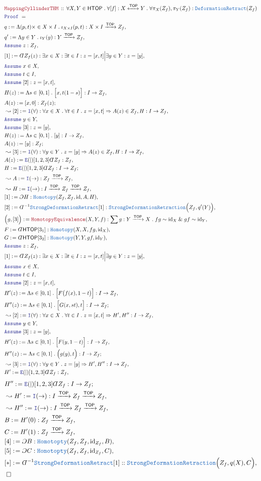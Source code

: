 \documentclass[12pt]{scrartcl}
\newcommand{\TYPE}[1]{\textcolor{NavyBlue}{\mathtt{#1}}}
\newcommand{\LOGIC}[1]{\textcolor{Blue}{\mathtt{#1}}}
\newcommand{\THM}[1]{\textcolor{Maroon}{\mathtt{#1}}}
\renewcommand{\.}{\; . \;}
\newcommand{\de}{: \kern 0.1pc =}
\newcommand{\Theorem}[2]{& \THM{#1} \, :: \, #2 \\ & \Proof = \\ }
\newcommand{\Page}[1]{ \begin{align*} #1 \end{align*}   }
\newcommand{ \bd }{ \ByDef }
\renewcommand{\And}{\; \& \;}
\newcommand{\Imply}{\Rightarrow}
\newcommand{\Intro}{\LOGIC{I}}
\newcommand{\Elim}{\LOGIC{E}}
\DeclareMathOperator*{\id}{id}
\newcommand{\ToIso}{\xleftrightarrow}
\newcommand{\Arrow}{\xrightarrow}
\newcommand{\Say}[3]{& #1 \de #2 : #3, \\}
\newcommand{\Conclude}[3]{& #1 \de #2 : #3; \\}
\newcommand{\Derive}[3]{& \leadsto #1 \de #2 : #3, \\}
\newcommand{\Assume}[2]{& \LOGIC{Assume} \; #1 : #2, \\}
\newcommand{\AssumeIn}[2]{& \LOGIC{Assume} \; #1 \in #2, \\}
\newcommand{\QED}{\; \square}
\newcommand{\EndProof}{& \QED \\}
\newcommand{\ByDef}{\rotatebox[origin=c]{-180}{$D$}}%
\newcommand{\ByConstr}{\rotatebox[origin=c]{-180}{$C$}}%
\newcommand{\Proof}{\LOGIC{Proof} \; }
\newcommand{\TOP}{\mathsf{TOP}}
\newcommand{\HTOP}{\mathsf{HTOP}}
\begin{document}
\Page{
	\Theorem{MappingCyllinderTHM}
	{
		\forall X,Y \in \HTOP \.
		\forall [f] : X \ToIso{\TOP} Y \.
		\forall \pi_X(Z_f),\pi_Y(Z_f) : \TYPE{DeformationRetract}(Z_f)
	}
	\Say{q}{\Lambda (p,t) \times \in X \times I \. \iota_{X \times I}(p,t) }
	{
		X \times I \Arrow{\TOP} Z_f
	}
	\Say{q'}{\Lambda y \in Y \. \iota_{Y}(y) }
	{
		Y  \Arrow{\TOP} Z_f
	}
	\Assume{z}{Z_f}
	\Say{[1]}{\bd Z_f(z)}{\exists x \in X : \exists t \in I : z = [x,t]  \Big| \exists y \in Y : z = [y]}
	\AssumeIn{x}{X}
	\AssumeIn{t}{I}
	\Assume{[2]}{z = [x,t]}
	\Say{H(z)}{\Lambda s \in [0,1] \. \Big[x,t(1-s)\Big]}{I \to Z_f}
	\Conclude{A(z)}{[x,0]}{ Z_f(z) }
	\Derive{[2]}{\Intro(\forall)}{\forall x \in X \. \forall t \in I \. z = [x,t] \Imply A(z) \in Z_f, H : I \to Z_f}
	\AssumeIn{y}{Y}
	\Assume{[3]}{z = [y]}
	\Say{H(z)}{\Lambda s \in [0,1] \. [y]}{I \to Z_f}
	\Conclude{A(z)}{[y]}{ Z_f }
	\Derive{[3]}{\Intro(\forall)}{\forall y \in Y \. z = [y] \Imply A(z) \in Z_f, H : I \to Z_f }
	\Say{A(z)}{\Elim(|)[1,2,3]\bd Z_f}{ Z_f  }
	\Conclude{H}{\Elim(|)[1,2,3]\bd Z_f}{I \to Z_f}
	\Derive{A}{\Intro(\to)}{Z_f \Arrow{\TOP} Z_f}
	\Derive{H}{\Intro(\to)}{I \Arrow{\TOP} Z_f \Arrow{\TOP} Z_f}
	\Say{[1]}{\ByConstr H}{\TYPE{Homotopy}(Z_f, Z_f, \id, A, H)}
	\Say{[2]}{\bd^{-1} \TYPE{StrongDeformationRetract}[1]}
	{
		\TYPE{StrongDeformationRetraction}\Big(Z_f,q'(Y)\Big)
	}
	\Say{\Big( g, [3] \Big)}
	{
		\THM{HomotopyEquivalence}(X,Y,f)
	}
	{
		\sum g : Y \Arrow{\TOP} X \.
		fg \sim {\id}_X \And gf \sim {\id}_Y
	}
	\Say{F}{\bd \HTOP [3_1]}{\TYPE{Homotopy}(X,X,fg,{\id}_X)}
	\Say{G}{\bd \HTOP [3_2]}{\TYPE{Homotopy}(Y,Y,gf,{\id}_Y)}
	\Assume{z}{Z_f}
	\Say{[1]}{\bd Z_f(z)}{\exists x \in X : \exists t \in I : z = [x,t]  \Big| \exists y \in Y : z = [y]}
	\AssumeIn{x}{X}
	\AssumeIn{t}{I}
	\Assume{[2]}{z = [x,t]}
	\Say{H'(z)}{\Lambda s \in [0,1] \. \Big[F\big( f(x),1-t\big)\Big]}{I \to Z_f}
	\Conclude{H''(z)}{\Lambda s \in [0,1] \. \Big[G(x,st),t\Big]}{ I \to Z_f }
	\Derive{[2]}{\Intro(\forall)}{\forall x \in X \. \forall t \in I \. z = [x,t] \Imply H',H'' : I \to Z_f}
	\AssumeIn{y}{Y}
	\Assume{[3]}{z = [y]}
	\Say{H'(z)}{\Lambda s \in [0,1] \. \Big[F(y,1-t)\Big]}{I \to Z_f}
	\Conclude{H''(z)}{\Lambda s \in [0,1] \. \Big(g(y),t\Big)}{ I \to Z_f }
	\Derive{[3]}{\Intro(\forall)}{\forall y \in Y \. z = [y] \Imply H', H'' : I \to Z_f }
	\Say{H'}{\Elim(|)[1,2,3]\bd Z_f}{ Z_f  }
}\Page{
	\Conclude{H''}{\Elim(|)[1,2,3]\bd Z_f}{I \to Z_f}
	\Derive{H'}{\Intro(\to)}{I \Arrow{\TOP} Z_f \Arrow{\TOP} Z_f}
	\Derive{H''}{\Intro(\to)}{I \Arrow{\TOP} Z_f \Arrow{\TOP} Z_f}
	\Say{B}{H'(0)}{Z_f \Arrow{\TOP} Z_f}
	\Say{C}{H'(1)}{Z_f \Arrow{\TOP} Z_f}
	\Say{[4]}{\ByConstr B}{ \TYPE{Homotopty}(Z_f,Z_f,{\id}_{Z_f},B)}
	\Say{[5]}{\ByConstr C}{ \TYPE{Homotopty}(Z_f,Z_f,{\id}_{Z_f},C)}
	\Say{[*]}{\bd^{-1} \TYPE{StrongDeformationRetract}[1]}
	{
		:\TYPE{StrongDeformationRetraction}\Big(Z_f,q(X),C\Big)
	}
	\EndProof
}
\newpage
\end{document}
